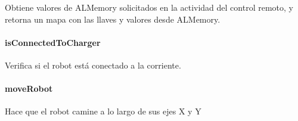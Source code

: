 \begin{fulllineitems}
\label{\detokenize{dev_docs:com.lar.cloudnao.Robot.getSelectedValuesFromMemory(List)}}
Obtiene valores de ALMemory solicitados en la actividad del control remoto, y retorna un mapa con las llaves y valores desde ALMemory.

\end{fulllineitems}



\paragraph{isConnectedToCharger}
\label{\detokenize{dev_docs:isconnectedtocharger}}

\begin{fulllineitems}
\label{\detokenize{dev_docs:com.lar.cloudnao.Robot.isConnectedToCharger()}}
Verifica si el robot está conectado a la corriente.

\end{fulllineitems}



\paragraph{moveRobot}
\label{\detokenize{dev_docs:moverobot}}

\begin{fulllineitems}
\label{\detokenize{dev_docs:com.lar.cloudnao.Robot.moveRobot(float, float)}}
Hace que el robot camine a lo largo de sus ejes X y Y

\end{fulllineitems}



